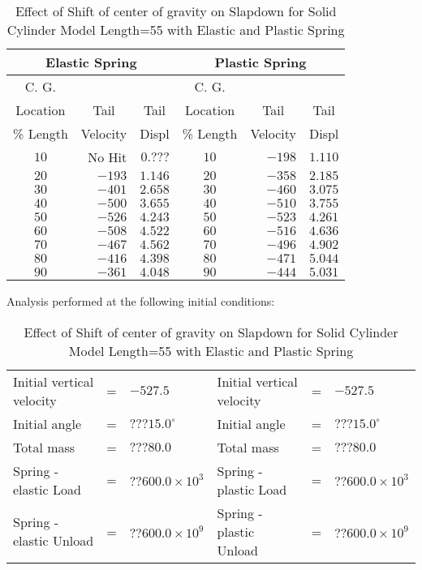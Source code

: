 \begin{table}
\begin{center}
\caption{Effect of Shift of center of gravity on Slapdown for Solid
Cylinder Model Length=55 with Elastic and Plastic Spring}
\makeqnum
\begin{tabular}{||c|r|r|c|r|r||}
\hline
\multicolumn{3}{||c|}{Elastic Spring} &\multicolumn{3}{c||}{Plastic 
Spring}\\
\hline
\multicolumn{1}{||c|}{C. G.}
& &
&\multicolumn{1}{c|}{C. G.}
& &\\
\multicolumn{1}{||c|}{Location}
&\multicolumn{1}{c|}{Tail}
&\multicolumn{1}{c|}{Tail}
&\multicolumn{1}{c|}{Location}
&\multicolumn{1}{c|}{Tail}
&\multicolumn{1}{c||}{Tail}\\
\multicolumn{1}{||c|}{\% Length}
&\multicolumn{1}{c|}{Velocity}
&\multicolumn{1}{c|}{Displ}
&\multicolumn{1}{c|}{\% Length}
&\multicolumn{1}{c|}{Velocity}
&\multicolumn{1}{c||}{Displ}\\
$10$ &No Hit &$0.???$ &$10$ &$-198$ &$1.110$\\
$20$ &$-193$ &$1.146$ &$20$ &$-358$ &$2.185$\\
$30$ &$-401$ &$2.658$ &$30$ &$-460$ &$3.075$\\
$40$ &$-500$ &$3.655$ &$40$ &$-510$ &$3.755$\\
$50$ &$-526$ &$4.243$ &$50$ &$-523$ &$4.261$\\
$60$ &$-508$ &$4.522$ &$60$ &$-516$ &$4.636$\\
$70$ &$-467$ &$4.562$ &$70$ &$-496$ &$4.902$\\
$80$ &$-416$ &$4.398$ &$80$ &$-471$ &$5.044$\\
$90$ &$-361$ &$4.048$ &$90$ &$-444$ &$5.031$\\
\hline
\end{tabular}
\end{center}

Analysis performed at the following initial conditions:

\makeqnum
\begin{tabular}{llllll}
Initial vertical velocity &= &$-527.5$
&Initial vertical velocity &= &$-527.5$\\
Initial angle &= &$???15.0^\circ$ &Initial angle &= &$???15.0^\circ$\\
Total mass &= &$???80.0$ &Total mass &= &$???80.0$\\
Spring - elastic     Load &=  &$??600.0\times10^3$
&Spring - plastic     Load &= &$??600.0\times10^3$\\
Spring - elastic   Unload &=  &$??600.0\times10^9$
&Spring - plastic   Unload &=  &$??600.0\times10^9$\\
\end{tabular}
\end{table}

